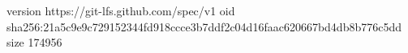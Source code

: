 version https://git-lfs.github.com/spec/v1
oid sha256:21a5c9e9c729152344fd918ccce3b7ddf2c04d16faac620667bd4db8b776c5dd
size 174956
